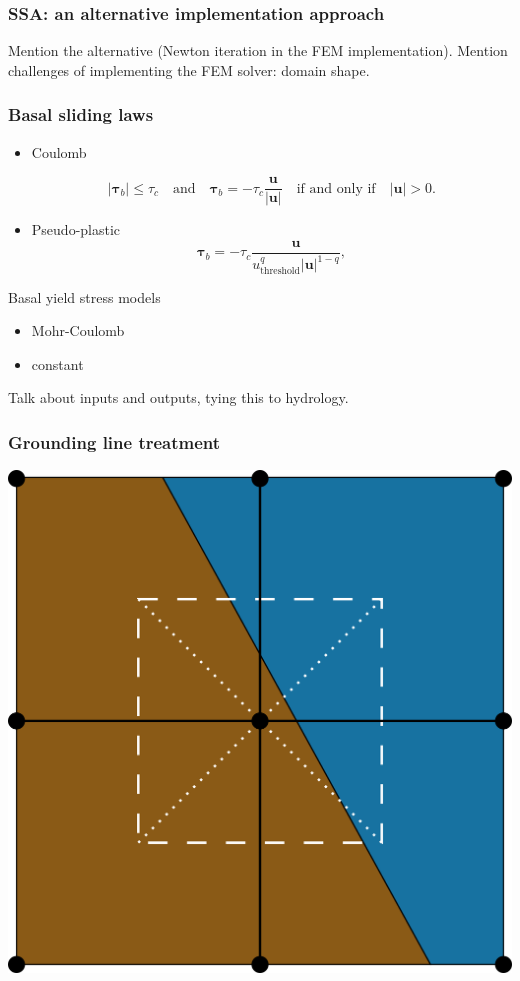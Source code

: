 \documentclass[hide notes,intlimits]{beamer}
\begin{document}
\begin{frame}
  \frametitle{SSA: an alternative implementation approach}

  Mention the alternative (Newton iteration in the FEM
  implementation). Mention challenges of implementing the FEM solver:
  domain shape.

\end{frame}

\begin{frame}
  \frametitle{Basal sliding laws}

  \begin{itemize}
  \item Coulomb

    \begin{equation}
      \label{eq:11}
      |\boldsymbol{\tau}_b| \le \tau_c \quad \text{and} \quad \boldsymbol{\tau}_b =
      - \tau_c \frac{\mathbf{u}}{|\mathbf{u}|} \quad\text{if and only if}\quad |\mathbf{u}| > 0.
    \end{equation}
  \item Pseudo-plastic
  \begin{equation}
    \label{eq:10}
    \boldsymbol{\tau}_b =  - \tau_c \frac{\mathbf{u}}{u_{\text{threshold}}^q |\mathbf{u}|^{1-q}},
  \end{equation}
  \end{itemize}
\end{frame}

\begin{frame}{Basal yield stress models}
  \begin{itemize}
  \item Mohr-Coulomb
  \item constant
  \end{itemize}

  Talk about inputs and outputs, tying this to hydrology.
\end{frame}

\begin{frame}
  \frametitle{Grounding line treatment}

  \begin{center}
    \includegraphics[width=0.4\linewidth]{grounded-cell-fraction}
  \end{center}

\end{frame}
\end{document}
